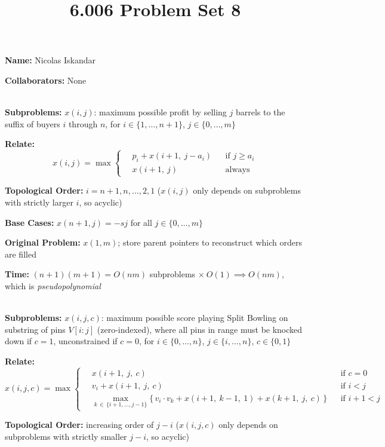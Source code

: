 \documentclass[12pt,twoside]{article}
\title{6.006 Problem Set 8}
\newcommand{\theproblemsetnum}{8}
\begin{document}
\handout{Problem Set \theproblemsetnum}

\setlength{\parindent}{0pt}
\medskip\hrulefill\medskip

{\bf Name:} Nicolas Iskandar

\medskip

{\bf Collaborators:} None

\medskip\hrulefill

\begin{problems}

\problem  %
\\
\textbf{Subproblems:} $x(i,j)$: maximum possible profit by selling $j$ barrels to the suffix of buyers $i$ through $n$, for $i \in \{1,\dots,n+1\}$, $j \in \{0,\dots,m\}$

\textbf{Relate:}
\[
x(i,j) = \max\left\{\,
\begin{aligned}
&p_i + x(i+1,\ j - a_i) &&\text{if } j \geq a_i \\
&x(i+1,\ j) &&\text{always}
\end{aligned}
\right.
\]

\textbf{Topological Order:} $i = n+1, n, \dots, 2, 1$ ($x(i,j)$ only depends on subproblems with strictly larger $i$, so acyclic)

\textbf{Base Cases:} $x(n+1,j) = -sj$ for all $j \in \{0,\dots,m\}$

\textbf{Original Problem:} $x(1,m)$; store parent pointers to reconstruct which orders are filled

\textbf{Time:} $(n+1)(m+1) = O(nm)$ subproblems $\times\ O(1) \implies O(nm)$, which is \emph{pseudopolynomial}


\problem  %
\\
\textbf{Subproblems:} $x(i,j,c)$: maximum possible score playing Split Bowling on substring of pins $V[i:j]$ (zero-indexed), where all pins in range must be knocked down if $c=1$, unconstrained if $c=0$, for $i \in \{0,\dots,n\}$, $j \in \{i,\dots,n\}$, $c \in \{0,1\}$

\textbf{Relate:}
\[
x(i,j,c) = \max\left\{\,
\begin{aligned}
&x(i+1,\ j,\ c) &&\text{if } c = 0 \\
&v_i + x(i+1,\ j,\ c) &&\text{if } i < j \\
&\max_{k \,\in\, \{i+1,\dots,j-1\}} \big\{\, v_i \cdot v_k + x(i+1,\ k-1,\ 1) + x(k+1,\ j,\ c) \,\big\} &&\text{if } i+1 < j
\end{aligned}
\right.
\]

\textbf{Topological Order:} increasing order of $j - i$ ($x(i,j,c)$ only depends on subproblems with strictly smaller $j-i$, so acyclic)


\end{problems}
\end{document}
